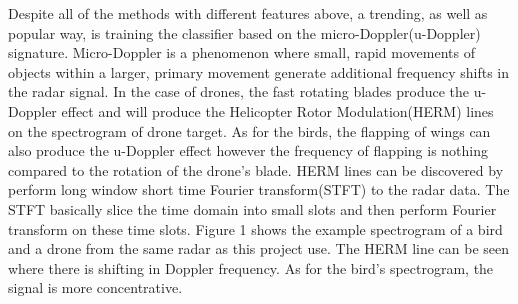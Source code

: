 \documentclass{cta-author}
\begin{document}
Despite all of the methods with different features above, a trending, as well as popular way, is training the classifier based on the micro-Doppler(u-Doppler) signature. Micro-Doppler is a phenomenon where small, rapid movements of objects within a larger, primary movement generate additional frequency shifts in the radar signal. In the case of drones, the fast rotating blades produce the u-Doppler effect and will produce the Helicopter Rotor Modulation(HERM) lines on the spectrogram of drone target. As for the birds, the flapping of wings can also produce the u-Doppler effect however the frequency of flapping is nothing compared to the rotation of the drone's blade.\cite{6} HERM lines can be discovered by perform long window short time Fourier transform(STFT) to the radar data.\cite{7} 
The STFT basically slice the time domain into small slots and then perform Fourier transform on these time slots. 
Figure 1\cite{8} shows the example spectrogram of a bird and a drone from the same radar as this project use. The HERM line can be seen where there is shifting in Doppler frequency. As for the bird's spectrogram, the signal is more concentrative. 
\end{document}
